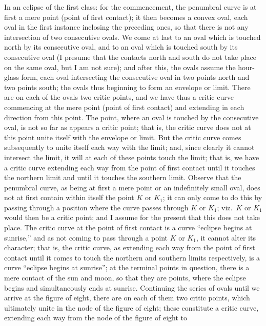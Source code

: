\documentclass[11pt,a4paper]{article}
\begin{document}
In an eclipse of the first class: for the commencement, the penumbral curve is at first a mere point (point of first contact); it then becomes a convex oval, each oval in the first instance inclosing the preceding ones, so that there is not any intersection of two consecutive ovals. We come at last to an oval which is touched north by its consecutive oval, and to an oval which is touched south by its consecutive oval (I presume that the contacts north and south do not take place on the same oval, but I am not sure); and after this, the ovals assume the hour-glass form, each oval intersecting the consecutive oval in two points north and two points south; the ovals thus beginning to form an envelope or limit. There are on each of the ovals two critic points, and we have thus a critic curve commencing at the mere point (point of first contact) and extending in each direction from this point. The point, where an oval is touched by the consecutive oval, is not so far as appears a critic point; that is, the critic curve does not at this point unite itself with the envelope or limit. But the critic curve comes subsequently to unite itself each way with the limit; and, since clearly it cannot intersect the limit, it will at each of these points touch the limit; that is, we have a critic curve extending each way from the point of first contact until it touches the northern limit and until it touches the southern limit. Observe that the penumbral curve, as being at first a mere point or an indefinitely small oval, does not at first contain within itself the point $K$ or $K_{1}$; it can only come to do this by passing through a position where the curve passes through $K$ or $K_{1}$; viz.\ $K$ or $K_{1}$ would then be a critic point; and I assume for the present that this does not take place. The critic curve at the point of first contact is a curve ``eclipse begins at sunrise,'' and as not coming to pass through a point $K$ or $K_{1}$, it cannot alter its character; that is, the critic curve, as extending each way from the point of first contact until it comes to touch the northern and southern limits respectively, is a curve ``eclipse begins at sunrise''; at the terminal points in question, there is a mere contact of the sun and moon, so that they are points, where the eclipse begins and simultaneously ends at sunrise. Continuing the series of ovals until we arrive at the figure of eight, there are on each of them two critic points, which ultimately unite in the node of the figure of eight; these constitute a critic curve, extending each way from the node of the figure of eight to
\end{document}
